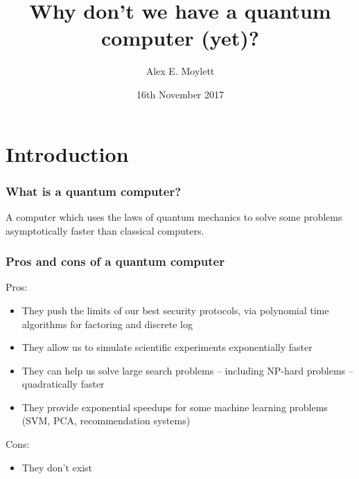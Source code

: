 \documentclass[]{beamer}
\title[Why don't we have a quantum computer?]{Why don't we have a quantum computer (yet)?} %
\author[Alex E. Moylett]{Alex E. Moylett} %
\institute[University of Bristol] %
{
Quantum Engineering Technology Labs and Quantum Engineering Centre for Doctoral Training\\
University of Bristol \\ %
\medskip
\textit{\href{mailto:alex.moylett@bristol.ac.uk}{alex.moylett@bristol.ac.uk}} %
}
\date{16th November 2017} %
\begin{document}
\begin{frame}
\titlepage %
\end{frame}


\section{Introduction}

\begin{frame}
\frametitle{What is a quantum computer?}
A computer which uses the laws of quantum mechanics to solve some problems asymptotically faster than classical computers.
\end{frame}

\begin{frame}
\frametitle{Pros and cons of a quantum computer}

Pros:
\begin{itemize}
\item<2-> They push the limits of our best security protocols, via polynomial time algorithms for factoring and discrete log
\item<3-> They allow us to simulate scientific experiments exponentially faster
\item<4-> They can help us solve large search problems -- including NP-hard problems -- quadratically faster
\item<5-> They provide exponential speedups for some machine learning problems (SVM, PCA, recommendation systems)
\end{itemize}

Cons:
\begin{itemize}
\item<6-> They don't exist
\end{itemize}
\end{frame}
\end{document}
